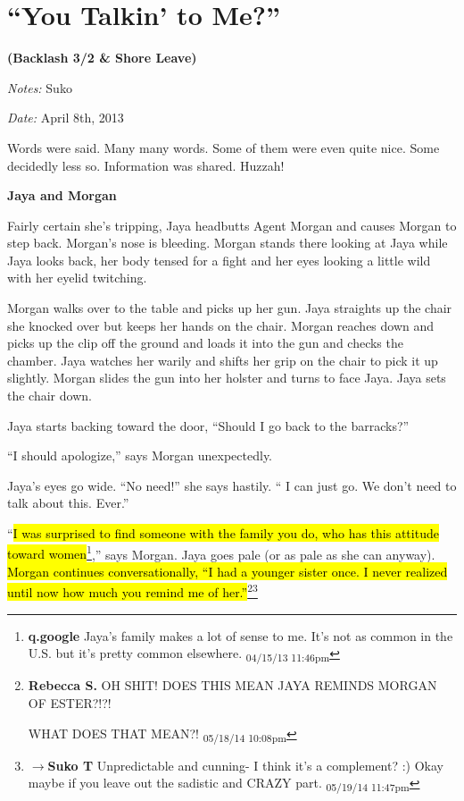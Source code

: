 \setcounter{chapter}{ 18 }
\chapter{\textbf{``You Talkin' to Me?''} }




\begin{center}
 {\LARGE \textbf{(Backlash 3/2 \& Shore Leave)} } 
\end{center}




\textit{Notes:} Suko

\textit{Date:} April 8th, 2013



Words were said.  Many many words.  Some of them were even quite nice.  Some decidedly less so.  Information was shared.  Huzzah!



\noindent\hrulefill





\textbf{Jaya and Morgan}



Fairly certain she's tripping, Jaya headbutts Agent Morgan and causes Morgan to step back.  Morgan's nose is bleeding.  Morgan stands there looking at Jaya while Jaya looks back, her body tensed for a fight and her eyes looking a little wild with her eyelid twitching.



Morgan walks over to the table and picks up her gun.  Jaya straights up the chair she knocked over but keeps her hands on the chair.  Morgan reaches down and picks up the clip off the ground and loads it into the gun and checks the chamber.  Jaya watches her warily and shifts her grip on the chair to pick it up slightly.  Morgan slides the gun into her holster and turns to face Jaya.  Jaya sets the chair down.



Jaya starts backing toward the door, ``Should I go back to the barracks?''

``I should apologize,'' says Morgan unexpectedly.

Jaya's eyes go wide.  ``No need!'' she says hastily. `` I can just go.  We don't need to talk about this.  Ever.''

``\hl{I was surprised to find someone with the family you do, who has this attitude toward women}\footnote{\textbf{q.google }Jaya's family makes a lot of sense to me.  It's not as common in the U.S. but it's pretty common elsewhere. \textsubscript{04/15/13 11:46pm}},'' says Morgan.  Jaya goes pale (or as pale as she can anyway).  \hl{Morgan continues conversationally, ``I had a younger sister once.  I never realized until now how much you remind me of her.''}\footnote{\textbf{Rebecca S. }OH SHIT! 
DOES THIS MEAN JAYA REMINDS MORGAN OF ESTER?!?!

WHAT DOES THAT MEAN?! \textsubscript{05/18/14 10:08pm}}\footnote{$\rightarrow$\textbf{Suko T }Unpredictable and cunning- I think it's a complement? :)  Okay maybe if you leave out the sadistic and CRAZY part. \textsubscript{05/19/14 11:47pm}}

